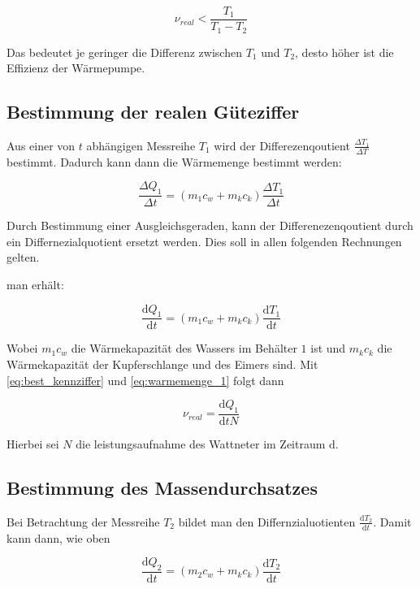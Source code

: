 \begin{equation*}
\nu_{real}<\frac{T_1}{T_1-T_2}
\end{equation*}

Das bedeutet je geringer die Differenz zwischen $T_1$ und $T_2$, 
desto höher ist die Effizienz der Wärmepumpe.

\subsection{Bestimmung der realen Güteziffer}
Aus einer von $t$ abhängigen Messreihe $T_1$ wird der Differezenqoutient $\frac{\Delta T_1}{\Delta T}$ bestimmt.
Dadurch kann dann die Wärmemenge bestimmt werden:

\begin{equation*}
\frac{\Delta Q_1}{\Delta t}=\left(m_1c_w+m_kc_k\right)\frac{\Delta T_1}{\Delta t}
\end{equation*}

Durch Bestimmung einer Ausgleichsgeraden, kann der 
Differenezenqoutient durch ein Differnezialquotient
ersetzt werden.
Dies soll in allen folgenden Rechnungen gelten.

man erhält:

\begin{equation}
\label{eq:warmemenge_1}
\frac{\mathup{d} Q_1}{\mathup{d} t}=\left(m_1c_w+m_kc_k\right)\frac{\mathup{d} T_1}{\mathup{d} t}
\end{equation}


Wobei $m_1c_w$ die Wärmekapazität des Wassers im Behälter $1$ ist und 
$m_kc_k$ die Wärmekapazität der Kupferschlange und des Eimers sind.
Mit \eqref{eq:best_kennziffer} und \eqref{eq:warmemenge_1} folgt dann

\begin{equation}
\label{eq:bestimmung_ziffer}
\nu_{real}=\frac{\mathup{d}Q_1}{\mathup{d}tN}
\end{equation}

Hierbei sei $N$ die leistungsaufnahme des Wattneter im Zeitraum $\mathup{d}$.

\subsection{Bestimmung des Massendurchsatzes}

Bei Betrachtung der Messreihe $T_2$ bildet man den Differnzialuotienten $\frac{\mathup{d}T_2}{\mathup{d}t}$.
Damit kann dann, wie oben

\begin{equation*}
\frac{\mathup{d} Q_2}{\mathup{d} t}=\left(m_2c_w+m_kc_k\right)\frac{\mathup{d} T_2}{\mathup{d} t}
\end{equation*}

